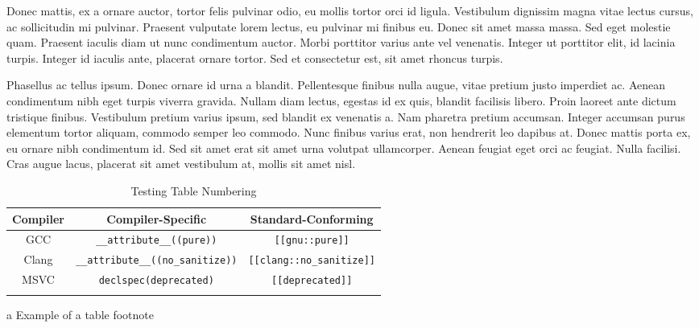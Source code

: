 Donec mattis, ex a ornare auctor, tortor felis pulvinar odio, eu mollis tortor orci id ligula. Vestibulum dignissim magna vitae lectus cursus, ac sollicitudin mi pulvinar. Praesent vulputate lorem lectus, eu pulvinar mi finibus eu. Donec sit amet massa massa. Sed eget molestie quam. Praesent iaculis diam ut nunc condimentum auctor. Morbi porttitor varius ante vel venenatis. Integer ut porttitor elit, id lacinia turpis. Integer id iaculis ante, placerat ornare tortor. Sed et consectetur est, sit amet rhoncus turpis.

Phasellus ac tellus ipsum. Donec ornare id urna a blandit. Pellentesque finibus nulla augue, vitae pretium justo imperdiet ac. Aenean condimentum nibh eget turpis viverra gravida. Nullam diam lectus, egestas id ex quis, blandit facilisis libero. Proin laoreet ante dictum tristique finibus. Vestibulum pretium varius ipsum, sed blandit ex venenatis a. Nam pharetra pretium accumsan. Integer accumsan purus elementum tortor aliquam, commodo semper leo commodo. Nunc finibus varius erat, non hendrerit leo dapibus at. Donec mattis porta ex, eu ornare nibh condimentum id. Sed sit amet erat sit amet urna volutpat ullamcorper. Aenean feugiat eget orci ac feugiat. Nulla facilisi. Cras augue lacus, placerat sit amet vestibulum at, mollis sit amet nisl.%
\begin{table}[h!] 
\begin{center}
\begin{threeparttable}
\caption{Testing Table Numbering}\label{test-table1}\vspace{1.5ex} 
{\small \begin{tabular}{c|c|c}\thickhline 
\rowcolor[gray]{.9}   {\sffamily\bfseries Compiler} & {\sffamily\bfseries Compiler-Specific} &
{\sffamily\bfseries Standard-Conforming} \\ \hline 
GCC\tnote{a} &\lstinline!__attribute__((pure))! & \lstinline![[gnu::pure]]! \\ \hline
Clang & \lstinline!__attribute__((no_sanitize))! &\lstinline![[clang::no_sanitize]]! \\ \hline 
MSVC & \lstinline!declspec(deprecated)! & \lstinline![[deprecated]]! \\ \thickhline
\end{tabular}
}
\begin{tablenotes}{\footnotesize
\item[a]{Example of a table footnote}
} %
\end{tablenotes} %
\end{threeparttable} 
\end{center}
\end{table}

